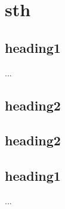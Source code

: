 \documentclass{article}
\begin{document}
\printglossaries
\clearpage

\section{sth}
\subsection{\Gls{heading1}}
...
\subsection{\Gls{heading2}}
\lipsum
\subsection{\Gls{heading2}}
\lipsum
\subsection{\Gls{heading1}}
...
\end{document}

